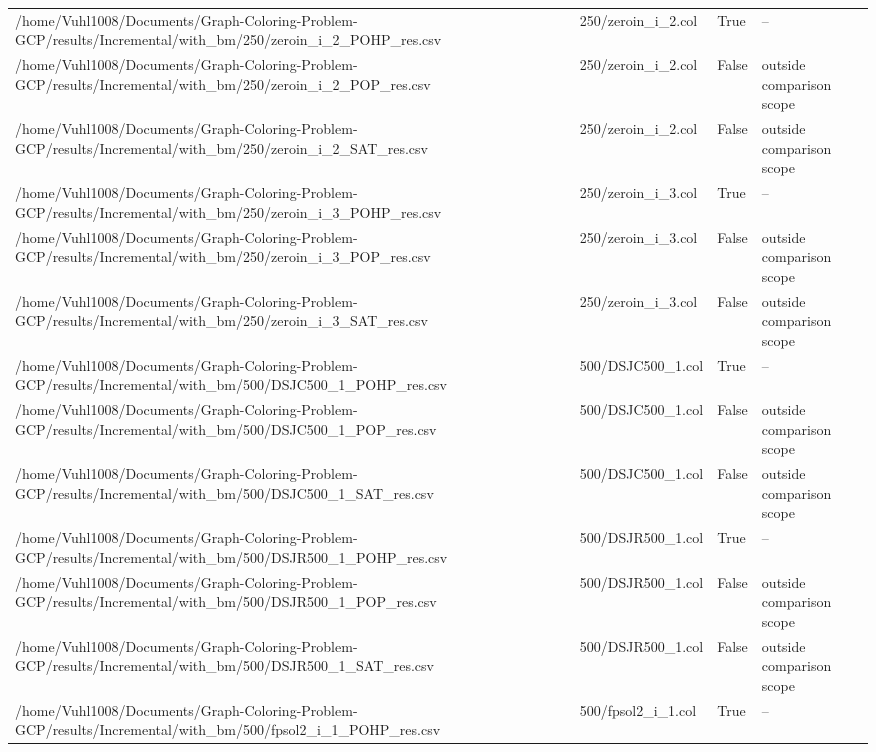 \begin{table}[htbp]
\begin{tabular}{llll}
/home/Vuhl1008/Documents/Graph-Coloring-Problem-GCP/results/Incremental/with\_bm/250/zeroin\_i\_2\_POHP\_res.csv & 250/zeroin\_i\_2.col & True & -- \\
/home/Vuhl1008/Documents/Graph-Coloring-Problem-GCP/results/Incremental/with\_bm/250/zeroin\_i\_2\_POP\_res.csv & 250/zeroin\_i\_2.col & False & outside comparison scope \\
/home/Vuhl1008/Documents/Graph-Coloring-Problem-GCP/results/Incremental/with\_bm/250/zeroin\_i\_2\_SAT\_res.csv & 250/zeroin\_i\_2.col & False & outside comparison scope \\
/home/Vuhl1008/Documents/Graph-Coloring-Problem-GCP/results/Incremental/with\_bm/250/zeroin\_i\_3\_POHP\_res.csv & 250/zeroin\_i\_3.col & True & -- \\
/home/Vuhl1008/Documents/Graph-Coloring-Problem-GCP/results/Incremental/with\_bm/250/zeroin\_i\_3\_POP\_res.csv & 250/zeroin\_i\_3.col & False & outside comparison scope \\
/home/Vuhl1008/Documents/Graph-Coloring-Problem-GCP/results/Incremental/with\_bm/250/zeroin\_i\_3\_SAT\_res.csv & 250/zeroin\_i\_3.col & False & outside comparison scope \\
/home/Vuhl1008/Documents/Graph-Coloring-Problem-GCP/results/Incremental/with\_bm/500/DSJC500\_1\_POHP\_res.csv & 500/DSJC500\_1.col & True & -- \\
/home/Vuhl1008/Documents/Graph-Coloring-Problem-GCP/results/Incremental/with\_bm/500/DSJC500\_1\_POP\_res.csv & 500/DSJC500\_1.col & False & outside comparison scope \\
/home/Vuhl1008/Documents/Graph-Coloring-Problem-GCP/results/Incremental/with\_bm/500/DSJC500\_1\_SAT\_res.csv & 500/DSJC500\_1.col & False & outside comparison scope \\
/home/Vuhl1008/Documents/Graph-Coloring-Problem-GCP/results/Incremental/with\_bm/500/DSJR500\_1\_POHP\_res.csv & 500/DSJR500\_1.col & True & -- \\
/home/Vuhl1008/Documents/Graph-Coloring-Problem-GCP/results/Incremental/with\_bm/500/DSJR500\_1\_POP\_res.csv & 500/DSJR500\_1.col & False & outside comparison scope \\
/home/Vuhl1008/Documents/Graph-Coloring-Problem-GCP/results/Incremental/with\_bm/500/DSJR500\_1\_SAT\_res.csv & 500/DSJR500\_1.col & False & outside comparison scope \\
/home/Vuhl1008/Documents/Graph-Coloring-Problem-GCP/results/Incremental/with\_bm/500/fpsol2\_i\_1\_POHP\_res.csv & 500/fpsol2\_i\_1.col & True & -- \\

\end{tabular}
\end{table}
